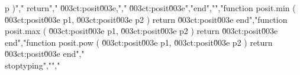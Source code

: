p )","    return","        \u003ct:posit\u003e,","        \u003ct:posit\u003e","end","","function posit.min ( \u003ct:posit\u003e p1, \u003ct:posit\u003e p2 ) return \u003ct:posit\u003e end","function posit.max ( \u003ct:posit\u003e p1, \u003ct:posit\u003e p2 ) return \u003ct:posit\u003e end","function posit.pow ( \u003ct:posit\u003e p1, \u003ct:posit\u003e p2 ) return \u003ct:posit\u003e end","\\stoptyping","","%